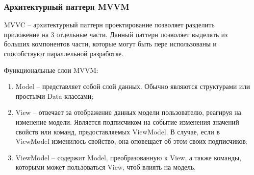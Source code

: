 \subsubsection{Архитектурный паттерн MVVM}\indent


MVVC – архитектурный паттерн проектирование позволяет разделить приложение на 3 отдельные части. Данный паттерн позволяет выделять из больших компонентов части, которые могут быть пере использованы и способствуют параллельной разработке.

Функциональные слои MVVM:
\begin{enumerate}
    \item Model – представляет собой слой данных.
    Обычно являются структурами или простыми Data классами;
    \item View – отвечает за отображение данных модели пользователю, реагируя на изменение модели.
    Является подписчиком на событие изменения значений свойств или команд, предоставляемых ViewModel.
    В случае, если в ViewModel изменилось свойство, она оповещает об этом своих подписчиков;
    \item ViewModel – содержит Model, преобразованную к View, а также команды, которыми может пользоваться View, чтоб влиять на модель.
\end{enumerate}